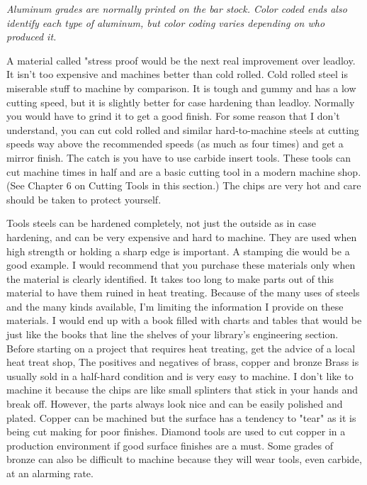 \bigskip
\textit{Aluminum grades are normally printed on the bar stock. Color coded ends
also identify each type of aluminum, but color coding varies depending on who
produced it.}
\bigskip

A material called "stress proof would be the next real improvement over leadloy.
It isn't too expensive and machines better than cold rolled. Cold rolled steel
is miserable stuff to machine by comparison. It is tough and gummy and has a low
cutting speed, but it is slightly better for case hardening than leadloy.
Normally you would have to grind it to get a good finish. For some reason that I
don't understand, you can cut cold rolled and similar hard-to-machine steels at
cutting speeds way above the recommended speeds (as much as four times) and get
a mirror finish. The catch is you have to use carbide insert tools. These tools
can cut machine times in half and are a basic cutting tool in a modern machine
shop. (See Chapter 6 on Cutting Tools in this section.) The chips are very hot
and care should be taken to protect yourself.

Tools steels can be hardened completely, not just the outside as in case
hardening, and can be very expensive and hard to machine. They are used when
high strength or holding a sharp edge is important. A stamping die would be a
good example. I would recommend that you purchase these materials only when the
material is clearly identified. It takes too long to make parts out of this
material to have them ruined in heat treating. Because of the many uses of
steels and the many kinds available, I'm limiting the information I provide on
these materials. I would end up with a book filled with charts and tables that
would be just like the books that line the shelves of your library's engineering
section. Before starting on a project that requires heat treating, get the
advice of a local heat treat shop, The positives and negatives of brass, copper
and bronze Brass is usually sold in a half-hard condition and is very easy to
machine. I don't like to machine it because the chips are like small splinters
that stick in your hands and break off. However, the parts always look nice and
can be easily polished and plated. Copper can be machined but the surface has a
tendency to "tear" as it is being cut making for poor finishes. Diamond tools
are used to cut copper in a production environment if good surface finishes are
a must. Some grades of bronze can also be difficult to machine because they will
wear tools, even carbide, at an alarming rate.

